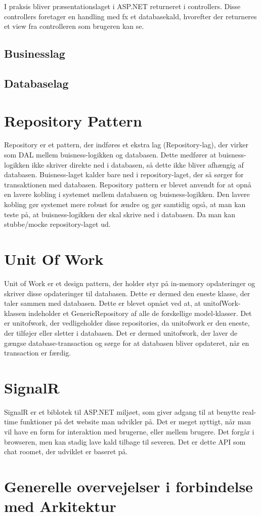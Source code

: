 I  praksis bliver  præsentationslaget i ASP.NET returneret i controllers. Disse controllers foretager en handling med fx et databasekald, hvorefter der returneres et view fra controlleren som brugeren kan se.
\subsection{Businesslag}

\subsection{Databaselag}

\section{Repository Pattern}
Repository er et pattern, der indføres et ekstra lag (Repository-lag), der virker som DAL mellem buisness-logikken og databasen. Dette medfører at buisness-logikken ikke skriver direkte ned i databasen, så dette ikke bliver afhængig af databasen. Buisness-laget kalder bare ned i repository-laget, der så sørger for transaktionen med databasen. 
Repository pattern er blevet anvendt for at opnå en lavere kobling i systemet mellem databasen og buisness-logikken. Den lavere kobling gør systemet mere robust for ændre og gør samtidig også, at man kan teste på, at buisness-logikken der skal skrive ned i databasen. Da man kan stubbe/mocke repository-laget ud.

\section{Unit Of Work}
Unit of Work er et design pattern, der holder styr på in-memory opdateringer og skriver disse opdateringer til databasen. Dette er dermed den eneste klasse, der taler sammen med databasen.
Dette er blevet opnået ved at, at unitofWork-klassen indeholder et GenericRepository af alle de forskellige model-klasser. Det er unitofwork, der vedligeholder disse repositories, da unitofwork er den eneste, der tilføjer eller sletter i databasen. Det er dermed unitofwork, der laver de gængse database-transaction og sørge for at databasen bliver opdateret, når en transaction er færdig.

\section{SignalR}
SignalR er et biblotek til ASP.NET miljøet, som giver adgang til at benytte real-time funktioner på det website man udvikler på. Det er meget nyttigt, når man vil have en form for interaktion med brugerne, eller mellem brugere. Det forgår i browseren, men kan stadig lave kald tilbage til severen. Det er dette API som chat roomet, der udviklet er baseret på. 

\section{Generelle overvejelser i forbindelse med Arkitektur}